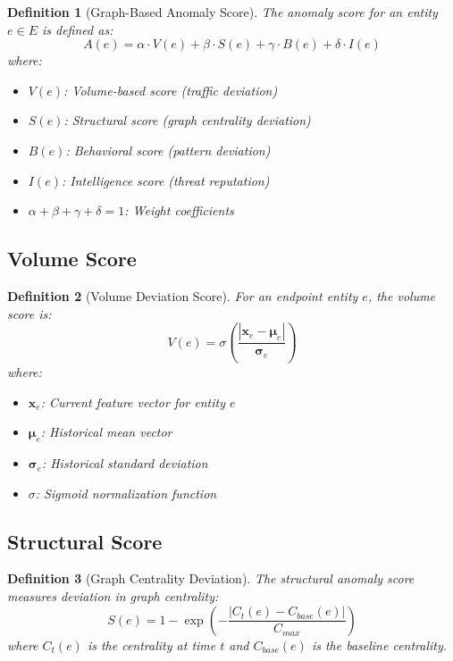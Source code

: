 \documentclass[11pt]{article}
\newtheorem{definition}{Definition}
\begin{document}
\begin{definition}[Graph-Based Anomaly Score]
The anomaly score for an entity $e \in E$ is defined as:
\begin{equation}
    A(e) = \alpha \cdot V(e) + \beta \cdot S(e) + \gamma \cdot B(e) + \delta \cdot I(e)
\end{equation}
where:
\begin{itemize}
    \item $V(e)$: Volume-based score (traffic deviation)
    \item $S(e)$: Structural score (graph centrality deviation)
    \item $B(e)$: Behavioral score (pattern deviation)
    \item $I(e)$: Intelligence score (threat reputation)
    \item $\alpha + \beta + \gamma + \delta = 1$: Weight coefficients
\end{itemize}
\end{definition}

\subsection{Volume Score}

\begin{definition}[Volume Deviation Score]
For an endpoint entity $e$, the volume score is:
\begin{equation}
    V(e) = \sigma\left(\frac{|\mathbf{x}_e - \boldsymbol{\mu}_e|}{\boldsymbol{\sigma}_e}\right)
\end{equation}
where:
\begin{itemize}
    \item $\mathbf{x}_e$: Current feature vector for entity $e$
    \item $\boldsymbol{\mu}_e$: Historical mean vector
    \item $\boldsymbol{\sigma}_e$: Historical standard deviation
    \item $\sigma$: Sigmoid normalization function
\end{itemize}
\end{definition}

\subsection{Structural Score}

\begin{definition}[Graph Centrality Deviation]
The structural anomaly score measures deviation in graph centrality:
\begin{equation}
    S(e) = 1 - \exp\left(-\frac{|C_t(e) - C_{base}(e)|}{C_{max}}\right)
\end{equation}
where $C_t(e)$ is the centrality at time $t$ and $C_{base}(e)$ is the baseline centrality.
\end{definition}
\end{document}
